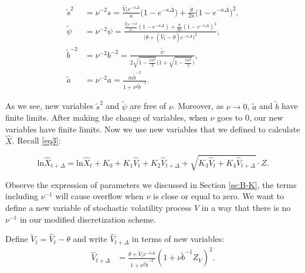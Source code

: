 \documentclass{ws-ijfe}
\begin{document}
\begin{align*}
\tilde{s}^2&={\nu}^{-2}s=\frac{\hat{V}_t e^{-\kappa\Delta}}{\kappa}\big(1-e^{-\kappa\Delta}\big)+\frac{\theta}{2\kappa}\big(1-e^{-\kappa\Delta}\big)^2,
\\
\tilde{\psi}&= \nu^{-2}\psi=\frac{\frac{\hat{V}_te^{-\kappa\Delta}}{\kappa}(1-e^{-\kappa\Delta})+\frac{\theta}{2\kappa}(1-e^{-\kappa\Delta})^2}{\big(\theta+(\hat{V}_t-\theta)e^{-\kappa\Delta}\big)^2},\\
\tilde{b}^{-2}&=\nu^{-2}b^{-2}=\frac{\tilde{\psi}}{2\sqrt{1-\frac{\tilde{\psi}\nu^2}{2}}\bigg(1+\sqrt{1-\frac{\tilde{\psi}\nu^2}{2}}\bigg)} ,\\
\tilde{a}&=\nu^{-2}a=\frac{m\tilde{b}^{-2}}{1+\nu^2\tilde{b}^{-2}}.
\end{align*}


As we see, new variables $\tilde{s}^2$ and $\tilde{\psi}$ are free of $\nu$. Moreover, as $\nu\rightarrow0$, $\tilde{a}$ and $\tilde{b}$ have finite limits. After making the change of variables, when $\nu$ goes to $0$, our new variables have finite limits.
Now we use new variables that we defined to calculate $\hat{X}$. Recall \eqref{eq3}:

\begin{equation*}
  \text{ln}\hat{X}_{t+\Delta}=\text{ln}\hat{X}_t+K_0+K_1\hat{V}_t+K_2\hat{V}_{t+\Delta}+\sqrt{K_3\hat{V}_{t}+K_4\hat{V}_{t+\Delta}}\cdot Z.
\end{equation*}

Observe the expression of parameters we discussed in Section \ref{se:B-K}, the terms including $\nu^{-1}$ will cause overflow when $\nu$ is close or equal to zero. We want to define a new variable of stochastic volatility process $V$ in a way that there is no $\nu^{-1}$ in our modified discretization scheme.

Define $\tilde{V}_t=\hat{V}_t-\theta$ and write $\hat{V}_{t+\Delta}$ in terms of new variables:
\begin{equation*}
\begin{split}
\hat{V}_{t+\Delta}%
&=\frac{\theta+\tilde{V}_te^{-\kappa\Delta}}{1+\nu^2\tilde{b}^{-2}}(1+\nu\tilde{b}^{-1}Z_V)^2.
\end{split}
\end{equation*}
\end{document}
